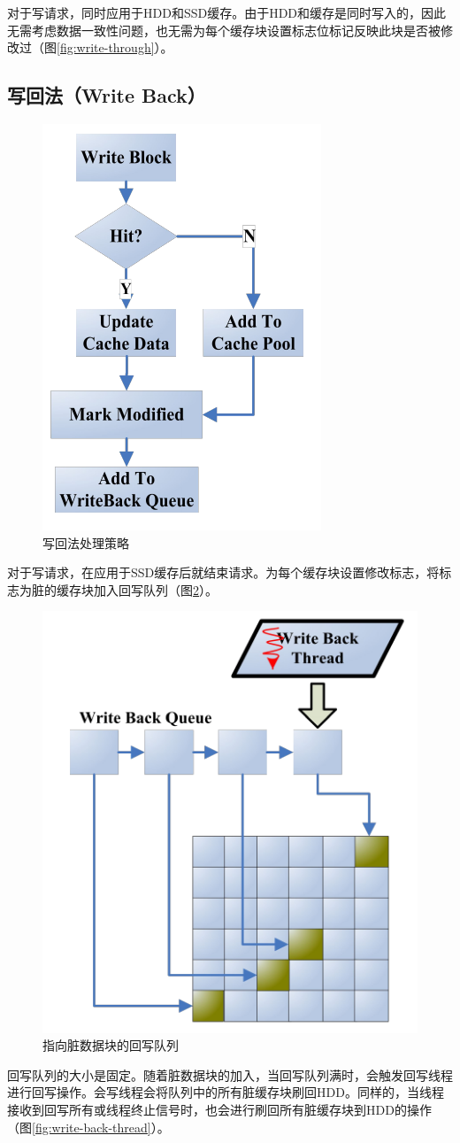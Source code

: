 对于写请求，同时应用于HDD和SSD缓存。由于HDD和缓存是同时写入的，因此无需考虑数据一致性问题，也无需为每个缓存块设置标志位标记反映此块是否被修改过（图\ref{fig:write-through}）。

\subsection{写回法（Write Back）}
\begin{figure}[htb]
\centering
\includegraphics[width=0.4\linewidth]{./graph/write-back}
\caption{写回法处理策略}
\label{fig:write-back}
\end{figure}

对于写请求，在应用于SSD缓存后就结束请求。为每个缓存块设置修改标志，将标志为脏的缓存块加入回写队列（图\ref{fig:write-back-queue}）。

\begin{figure}[htb]
\centering
\includegraphics[width=0.4\linewidth]{./graph/write-back-queue}
\caption{指向脏数据块的回写队列}
\label{fig:write-back-queue}
\end{figure}

回写队列的大小是固定。随着脏数据块的加入，当回写队列满时，会触发回写线程进行回写操作。会写线程会将队列中的所有脏缓存块刷回HDD。同样的，当线程接收到回写所有或线程终止信号时，也会进行刷回所有脏缓存块到HDD的操作（图\ref{fig:write-back-thread}）。

